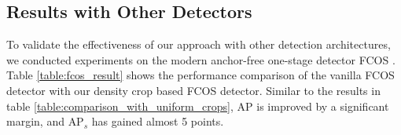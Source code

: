 \begin{table}
    \centering
    \caption{Comparison of iterative merging strategy with single-step merging where GT boxes are scaled according to scaling factors, and scaled uniformly by pixel values.}
    \label{table:scale_by_factor}
\end{table}

\subsection{Results with Other Detectors}
To validate the effectiveness of our approach with other detection architectures, we conducted experiments on the modern anchor-free one-stage detector FCOS \cite{fcos-Tian-2019}. Table \ref{table:fcos_result} shows the performance comparison of the vanilla FCOS detector with our density crop based FCOS detector. Similar to the results in table \ref{table:comparison_with_uniform_crops}, \textrm{AP} is improved by a significant margin, and $\textrm{AP}_{s}$ has gained almost 5 points. 

